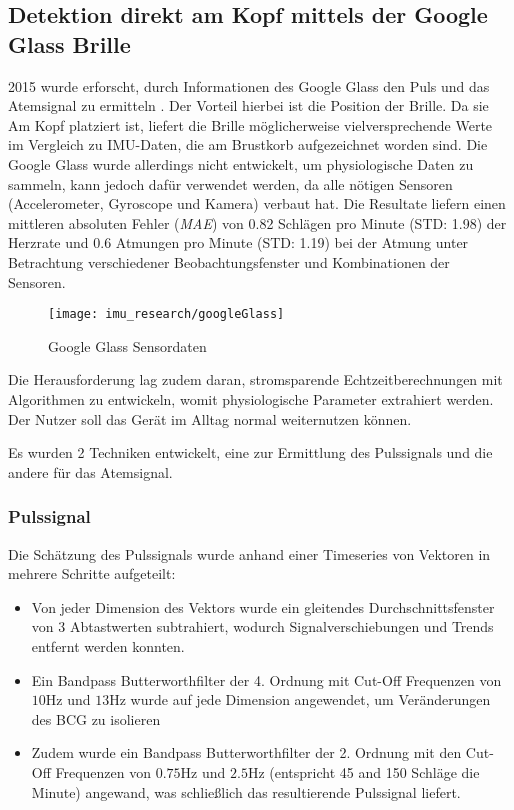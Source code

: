 \subsection{Detektion direkt am Kopf mittels der Google Glass Brille}
2015 wurde erforscht, durch Informationen des Google Glass den Puls und das Atemsignal zu ermitteln \cite{hernandez_cardiac_nodate}. 
Der Vorteil hierbei ist die Position der Brille. 
Da sie Am Kopf platziert ist, liefert die Brille möglicherweise vielversprechende Werte im Vergleich zu IMU-Daten, die am Brustkorb aufgezeichnet worden sind.
Die Google Glass wurde allerdings nicht entwickelt, um physiologische Daten zu sammeln, kann jedoch dafür verwendet werden, da alle nötigen Sensoren (Accelerometer, Gyroscope und Kamera) verbaut hat.
Die Resultate liefern einen mittleren absoluten Fehler (\textit{MAE}) von 0.82 Schlägen pro Minute (STD: 1.98) der Herzrate und 0.6 Atmungen pro Minute (STD: 1.19) bei der Atmung unter Betrachtung verschiedener Beobachtungsfenster und Kombinationen der Sensoren. 
\begin{figure}[ht]
    \centering
    \texttt{[image: imu\_research/googleGlass]}
    \caption{Google Glass Sensordaten \cite{hernandez_cardiac_nodate}}
    \label{imu_research_google_glass}
\end{figure}
Die Herausforderung lag zudem daran, stromsparende Echtzeitberechnungen mit Algorithmen zu entwickeln, womit physiologische Parameter extrahiert werden. Der Nutzer soll das Gerät im Alltag normal weiternutzen können. 

Es wurden 2 Techniken entwickelt, eine zur Ermittlung des Pulssignals und die andere für das Atemsignal.
\subsubsection{Pulssignal}
Die Schätzung des Pulssignals wurde anhand einer Timeseries von Vektoren in mehrere Schritte aufgeteilt:
\begin{itemize}
    \item Von jeder Dimension des Vektors wurde ein gleitendes Durchschnittsfenster von 3 Abtastwerten subtrahiert, wodurch Signalverschiebungen und Trends entfernt werden konnten.
    \item Ein Bandpass Butterworthfilter der 4. Ordnung mit Cut-Off Frequenzen von $10 \si{\hertz}$ und $13 \si{\hertz}$ wurde auf jede Dimension angewendet, um Veränderungen des BCG zu isolieren
    \item Zudem wurde ein Bandpass Butterworthfilter der 2. Ordnung mit den Cut-Off Frequenzen von $0.75 \si{\hertz}$ und $2.5 \si{\hertz}$ (entspricht 45 and 150 Schläge die Minute) angewand, was schließlich das resultierende Pulssignal liefert.
\end{itemize}

